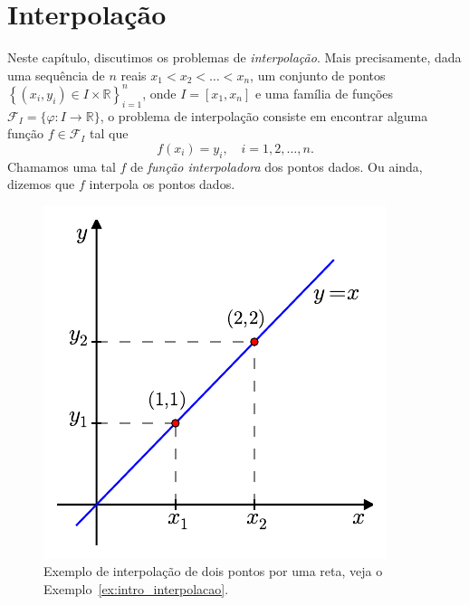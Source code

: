 
%

\chapter{Interpolação}\label{cap:interp}

Neste capítulo, discutimos os problemas de \emph{interpolação}. Mais precisamente, dada uma sequência de $n$ reais $x_1<x_2<\ldots<x_n$, um conjunto de pontos $\left\{(x_i, y_i)\in I\times\mathbb{R}\right\}_{i=1}^n$, onde $I=\left[x_1,x_n\right]$ e uma família de funções $\mathcal{F}_I = \{\varphi:I\rightarrow\mathbb{R}\}$, o problema de interpolação consiste em encontrar alguma função $f\in\mathcal{F}_I$ tal que
\begin{equation}
  f(x_i) = y_i,\quad i=1, 2, \dotsc, n.
\end{equation}
Chamamos uma tal $f$ de \emph{função interpoladora} dos pontos dados. Ou ainda, dizemos que $f$ interpola os pontos dados.

\begin{figure}
  \centering
  \includegraphics[scale=0.9]{./cap_interp/pics/ex_intro_interpolacao/ex_intro_interpolacao}
  \caption{Exemplo de interpolação de dois pontos por uma reta, veja o Exemplo~\ref{ex:intro_interpolacao}.}\label{fig:ex_intro_interp}
\end{figure}

